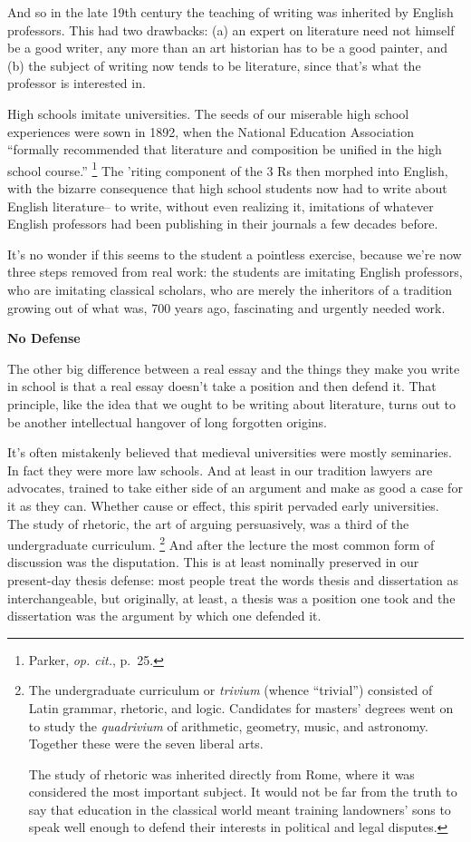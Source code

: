 And so in the late 19th century the teaching of writing was inherited by
English professors. This had two drawbacks: (a) an expert on literature
need not himself be a good writer, any more than an art historian has to
be a good painter, and (b) the subject of writing now tends to be
literature, since that's what the professor is interested in.

High schools imitate universities. The seeds of our miserable high
school experiences were sown in 1892, when the National Education
Association ``formally recommended that literature and composition be
unified in the high school course.'' \footnote{Parker, \emph{op. cit.}, p.~25.} The 'riting component of
the 3 Rs then morphed into English, with the bizarre consequence that
high school students now had to write about English literature-- to
write, without even realizing it, imitations of whatever English
professors had been publishing in their journals a few decades before.

It's no wonder if this seems to the student a pointless exercise,
because we're now three steps removed from real work: the students are
imitating English professors, who are imitating classical scholars, who
are merely the inheritors of a tradition growing out of what was, 700
years ago, fascinating and urgently needed work.

\textbf{No Defense}

The other big difference between a real essay and the things they make
you write in school is that a real essay doesn't take a position and
then defend it. That principle, like the idea that we ought to be
writing about literature, turns out to be another intellectual hangover
of long forgotten origins.

It's often mistakenly believed that medieval universities were mostly
seminaries. In fact they were more law schools. And at least in our
tradition lawyers are advocates, trained to take either side of an
argument and make as good a case for it as they can. Whether cause or
effect, this spirit pervaded early universities. The study of rhetoric,
the art of arguing persuasively, was a third of the undergraduate
curriculum. \footnote{The undergraduate curriculum or \emph{trivium} (whence
``trivial'') consisted of Latin grammar, rhetoric, and logic. Candidates
for masters' degrees went on to study the \emph{quadrivium} of
arithmetic, geometry, music, and astronomy. Together these were the
seven liberal arts.

The study of rhetoric was inherited directly from Rome, where it was
considered the most important subject. It would not be far from the
truth to say that education in the classical world meant training
landowners' sons to speak well enough to defend their interests in
political and legal disputes.} And after the lecture the most common form of
discussion was the disputation. This is at least nominally preserved in
our present-day thesis defense: most people treat the words thesis and
dissertation as interchangeable, but originally, at least, a thesis was
a position one took and the dissertation was the argument by which one
defended it.

